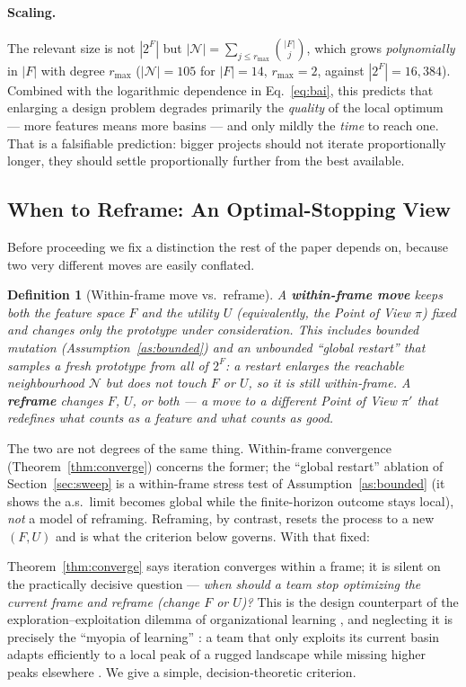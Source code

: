 \documentclass[11pt]{article}
\newtheorem{definition}{Definition}
\begin{document}
\paragraph{Scaling.} The relevant size is not $|2^F|$ but $|\mathcal N|=\sum_{j\le r_{\max}}\binom{|F|}{j}$, which grows \emph{polynomially} in $|F|$ with degree $r_{\max}$ ($|\mathcal N|=105$ for $|F|=14$, $r_{\max}=2$, against $|2^F|=16{,}384$). Combined with the logarithmic dependence in Eq.~\eqref{eq:bai}, this predicts that enlarging a design problem degrades primarily the \emph{quality} of the local optimum --- more features means more basins --- and only mildly the \emph{time} to reach one. That is a falsifiable prediction: bigger projects should not iterate proportionally longer, they should settle proportionally further from the best available.

\subsection{When to Reframe: An Optimal-Stopping View}
\label{sec:reframe}

Before proceeding we fix a distinction the rest of the paper depends on, because two very different moves are easily conflated.
\begin{definition}[Within-frame move vs.\ reframe]
\label{def:reframe}
A \textbf{within-frame move} keeps both the feature space $F$ and the utility $U$ (equivalently, the Point of View $\pi$) fixed and changes only the prototype under consideration. This includes bounded mutation (Assumption~\ref{as:bounded}) \emph{and} an unbounded ``global restart'' that samples a fresh prototype from all of $2^F$: a restart enlarges the reachable neighbourhood $\mathcal{N}$ but does not touch $F$ or $U$, so it is still within-frame. A \textbf{reframe} changes $F$, $U$, or both --- a move to a different Point of View $\pi'$ that redefines what counts as a feature and what counts as good.
\end{definition}
\noindent The two are not degrees of the same thing. Within-frame convergence (Theorem~\ref{thm:converge}) concerns the former; the ``global restart'' ablation of Section~\ref{sec:sweep} is a within-frame stress test of Assumption~\ref{as:bounded} (it shows the a.s.\ limit becomes global while the finite-horizon outcome stays local), \emph{not} a model of reframing. Reframing, by contrast, resets the process to a new $(F,U)$ and is what the criterion below governs. With that fixed:

Theorem~\ref{thm:converge} says iteration converges within a frame; it is silent on the practically decisive question --- \emph{when should a team stop optimizing the current frame and reframe (change $F$ or $U$)?} This is the design counterpart of the exploration--exploitation dilemma of organizational learning \citep{march1991}, and neglecting it is precisely the ``myopia of learning'' \citep{levinthal1993}: a team that only exploits its current basin adapts efficiently to a local peak of a rugged landscape while missing higher peaks elsewhere \citep{levinthal1997}. We give a simple, decision-theoretic criterion.
\end{document}
